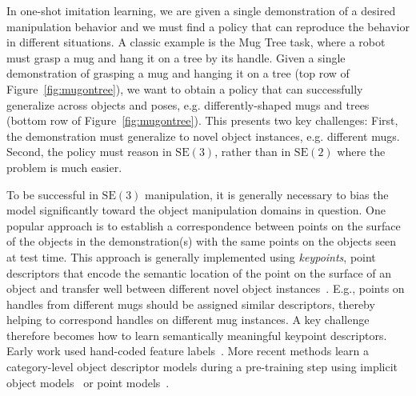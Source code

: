 \documentclass{article}
\begin{document}
In one-shot imitation learning, we are given a single demonstration of a desired manipulation behavior and we must find a policy that can reproduce the behavior in different situations. A classic example is the Mug Tree task, where a robot must grasp a mug and hang it on a tree by its handle. Given a single demonstration of grasping a mug and hanging it on a tree (top row of Figure~\ref{fig:mugontree}), we want to obtain a policy that can successfully generalize across objects and poses, e.g. differently-shaped mugs and trees (bottom row of Figure~\ref{fig:mugontree}). This presents two key challenges: First, the demonstration must generalize to novel object instances, e.g. different mugs. Second, the policy must reason in $\mathrm{SE}(3)$, rather than in $\mathrm{SE}(2)$ where the problem is much easier. 

To be successful in $\mathrm{SE}(3)$ manipulation, it is generally necessary to bias the model significantly toward the object manipulation domains in question. One popular approach is to establish a correspondence between points on the surface of the objects in the demonstration(s) with the same points on the objects seen at test time. This approach is generally implemented using \emph{keypoints}, point descriptors that encode the semantic location of the point on the surface of an object and transfer well between different novel object instances~\cite{pan2022tax,wang2019dynamic,manuelli2019kpam}. E.g., points on handles from different mugs should be assigned similar descriptors, thereby helping to correspond handles on different mug instances. A key challenge therefore becomes how to learn semantically meaningful keypoint descriptors. Early work used hand-coded feature labels~\cite{manuelli2019kpam}.
More recent methods learn a category-level object descriptor models during a pre-training step
using implicit object models~\cite{simeonov2022neural} or point models~\cite{pan2022tax}. 


\end{document}
